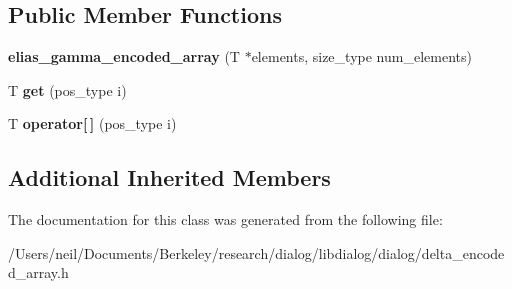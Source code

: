 \subsection*{Public Member Functions}
\begin{DoxyCompactItemize}
\item 
\mbox{\label{classdialog_1_1elias__gamma__encoded__array_a65bed69251739947eabd7e0a157b8923}} 
{\bfseries elias\+\_\+gamma\+\_\+encoded\+\_\+array} (T $\ast$elements, size\+\_\+type num\+\_\+elements)
\item 
\mbox{\label{classdialog_1_1elias__gamma__encoded__array_a34a2e347fc7b8c7091590a457954522c}} 
T {\bfseries get} (pos\+\_\+type i)
\item 
\mbox{\label{classdialog_1_1elias__gamma__encoded__array_ab9a186f942d1ce70c7a03b5b5a97fdbc}} 
T {\bfseries operator\mbox{[}$\,$\mbox{]}} (pos\+\_\+type i)
\end{DoxyCompactItemize}
\subsection*{Additional Inherited Members}


The documentation for this class was generated from the following file\+:\begin{DoxyCompactItemize}
\item 
/\+Users/neil/\+Documents/\+Berkeley/research/dialog/libdialog/dialog/delta\+\_\+encoded\+\_\+array.\+h\end{DoxyCompactItemize}
